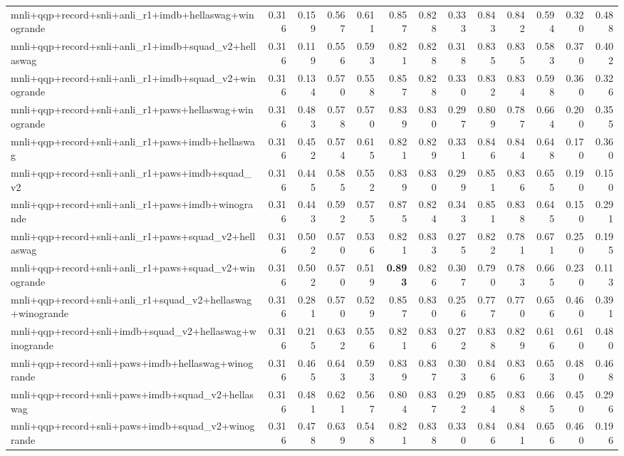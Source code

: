 \begin{table}[t]
\begin{tabular}{lrrrrrrrrrrrr}
    mnli+qqp+record+snli+anli\_r1+imdb+hellaswag+winogrande & 0.316 & 0.159 & 0.567 & 0.611 & 0.857 & 0.828 & 0.333 & 0.843 & 0.842 & 0.594 & 0.320 & 0.488 \\
    mnli+qqp+record+snli+anli\_r1+imdb+squad\_v2+hellaswag & 0.316 & 0.119 & 0.556 & 0.593 & 0.821 & 0.828 & 0.318 & 0.835 & 0.835 & 0.583 & 0.370 & 0.402 \\
    mnli+qqp+record+snli+anli\_r1+imdb+squad\_v2+winogrande & 0.316 & 0.134 & 0.570 & 0.558 & 0.857 & 0.828 & 0.330 & 0.832 & 0.834 & 0.598 & 0.360 & 0.326 \\
    mnli+qqp+record+snli+anli\_r1+paws+hellaswag+winogrande & 0.316 & 0.483 & 0.578 & 0.570 & 0.839 & 0.830 & 0.297 & 0.809 & 0.787 & 0.664 & 0.200 & 0.355 \\
    mnli+qqp+record+snli+anli\_r1+paws+imdb+hellaswag & 0.316 & 0.452 & 0.574 & 0.615 & 0.821 & 0.829 & 0.331 & 0.846 & 0.844 & 0.648 & 0.170 & 0.360 \\
    mnli+qqp+record+snli+anli\_r1+paws+imdb+squad\_v2 & 0.316 & 0.445 & 0.585 & 0.552 & 0.839 & 0.830 & 0.299 & 0.851 & 0.836 & 0.655 & 0.190 & 0.150 \\
    mnli+qqp+record+snli+anli\_r1+paws+imdb+winogrande & 0.316 & 0.443 & 0.592 & 0.575 & 0.875 & 0.824 & 0.343 & 0.851 & 0.838 & 0.645 & 0.150 & 0.291 \\
    mnli+qqp+record+snli+anli\_r1+paws+squad\_v2+hellaswag & 0.316 & 0.502 & 0.570 & 0.536 & 0.821 & 0.833 & 0.275 & 0.822 & 0.781 & 0.671 & 0.250 & 0.195 \\
    mnli+qqp+record+snli+anli\_r1+paws+squad\_v2+winogrande & 0.316 & 0.502 & 0.570 & 0.519 & \textbf{0.893} & 0.826 & 0.307 & 0.790 & 0.783 & 0.665 & 0.230 & 0.113 \\
    mnli+qqp+record+snli+anli\_r1+squad\_v2+hellaswag+winogrande & 0.316 & 0.281 & 0.570 & 0.529 & 0.857 & 0.830 & 0.256 & 0.777 & 0.770 & 0.656 & 0.460 & 0.391 \\
    mnli+qqp+record+snli+imdb+squad\_v2+hellaswag+winogrande & 0.316 & 0.215 & 0.632 & 0.556 & 0.821 & 0.836 & 0.272 & 0.838 & 0.829 & 0.616 & 0.610 & 0.480 \\
    mnli+qqp+record+snli+paws+imdb+hellaswag+winogrande & 0.316 & 0.465 & 0.643 & 0.593 & 0.839 & 0.837 & 0.303 & 0.846 & 0.836 & 0.653 & 0.480 & 0.468 \\
    mnli+qqp+record+snli+paws+imdb+squad\_v2+hellaswag & 0.316 & 0.481 & 0.621 & 0.567 & 0.804 & 0.837 & 0.292 & 0.854 & 0.838 & 0.665 & 0.450 & 0.296 \\
    mnli+qqp+record+snli+paws+imdb+squad\_v2+winogrande & 0.316 & 0.478 & 0.639 & 0.548 & 0.821 & 0.838 & 0.330 & 0.846 & 0.841 & 0.656 & 0.460 & 0.196 \\

\end{tabular}
\end{table}
